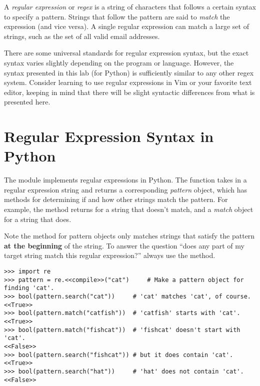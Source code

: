 

A \emph{regular expression} or \emph{regex} is a string of characters that follows a certain syntax to specify a pattern.
Strings that follow the pattern are said to \emph{match} the expression (and vice versa).
A single regular expression can match a large set of strings, such as the set of all valid email addresses.

\begin{warn}
There are some universal standards for regular expression syntax, but the exact syntax varies slightly depending on the program or language.
However, the syntax presented in this lab (for Python) is sufficiently similar to any other regex system.
Consider learning to use regular expressions in Vim or your favorite text editor, keeping in mind that there will be slight syntactic differences from what is presented here.
\end{warn}

\section*{Regular Expression Syntax in Python} %

The  module implements regular expressions in Python.
The function  takes in a regular expression string and returns a corresponding \emph{pattern} object, which has methods for determining if and how other strings match the pattern.
For example, the  method returns  for a string that doesn't match, and a \emph{match} object for a string that does.

Note the  method for pattern objects only matches strings that satisfy the pattern \textbf{at the beginning} of the string.
To answer the question ``does any part of my target string match this regular expression?'' always use the  method.

\begin{lstlisting}
>>> import re
>>> pattern = re.<<compile>>("cat")     # Make a pattern object for finding 'cat'.
>>> bool(pattern.search("cat"))     # 'cat' matches 'cat', of course.
<<True>>
>>> bool(pattern.match("catfish"))  # 'catfish' starts with 'cat'.
<<True>>
>>> bool(pattern.match("fishcat"))  # 'fishcat' doesn't start with 'cat'.
<<False>>
>>> bool(pattern.search("fishcat")) # but it does contain 'cat'.
<<True>>
>>> bool(pattern.search("hat"))     # 'hat' does not contain 'cat'.
<<False>>
\end{lstlisting}

